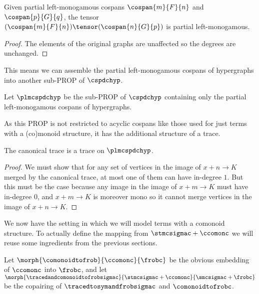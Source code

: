 \begin{lemma}
    Given partial left-monogamous cospans \(\cospan{m}{F}{n}\)
    and \(\cospan{p}{G}{q}\), the tensor \(
    (\cospan{m}{F}{n})
    \tensor
    (\cospan{n}{G}{p})
    \) is partial left-monogamous.
\end{lemma}
\begin{proof}
    The elements of the original graphs are unaffected so
    the degrees are unchanged.
\end{proof}

This means we can assemble the partial left-monogamous cospans of hypergraphs
into another sub-PROP of \(\cspdchyp\).

\begin{definition}
    Let \(\plmcspdchyp\) be the sub-PROP of \(\cspdchyp\) containing only the
    partial left-monogamous cospans of hypergraphs.
\end{definition}

As this PROP is not restricted to acyclic cospans like those used for just
terms with a (co)monoid structure, it has the additional structure of a trace.

\begin{proposition}
    The canonical trace is a trace on \(\plmcspdchyp\).
\end{proposition}
\begin{proof}
    We must show that for any set of vertices in the image
    of \(x + n \to K\) merged by the canonical trace, at most one of them can
    have in-degree \(1\).
    But this must be the case because any image in the image of
    \(x + m \to K\) must have in-degree \(0\), and \(x + m \to K\) is
    moreover mono so it cannot merge vertices in the image of
    \(x + n \to K\).
\end{proof}

We now have the setting in which we will model terms with a comonoid structure.
To actually define the mapping from \(\stmcsigmac + \ccomonc\) we will reuse
some ingredients from the previous sections.

\begin{definition}
    Let \(
    \morph{
        \comonoidtofrob
    }{
        \ccomonc
    }{
        \frobc
    }
    \) be the obvious embedding of \(\ccomonc\) into \(\frobc\), and let \(
    \morph{
        \tracedandcomonoidtofrobsigmac
    }{
        \stmcsigmac + \ccomonc
    }{
        \smcsigmac + \frobc
    }
    \) be the copairing of \(\tracedtosymandfrobsigmac\) and
    \(\comonoidtofrobc\).
\end{definition}

